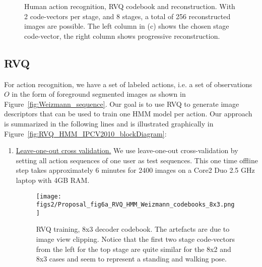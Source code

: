 \begin{Body}
								\begin{figure}[t]
								\centering
								\hspace{0.3in}
								\hspace{0.3in}
								\caption{Human action recognition, RVQ codebook and reconstruction.  With 2 code-vectors per stage, and 8 stages, a total of 256 reconstructed images are possible.  The left column in (c) shows the chosen stage code-vector, the right column shows progressive reconstruction.} 
							\label{fig:Weizmann_codebooks_and_reconstruction}		
								\end{figure}

\subsection{RVQ}
For action recognition, we have a set of labeled actions, i.e. a set of observations $O$ in the form of foreground segmented images as shown in Figure~\ref{fig:Weizmann_sequence}.  Our goal is to use RVQ to generate image descriptors that can be used to train one HMM model per action.  Our approach is summarized in the following lines and is illustrated graphically in Figure~\ref{fig:RVQ_HMM_IPCV2010_blockDiagram}:

\begin{enumerate}
\item \underline{Leave-one-out cross validation.}  We use leave-one-out cross-validation \cite{2000_JNL_SURVEYprml_Jain} by setting all action sequences of one user as test sequences.  This one time offline step takes approximately 6 minutes for 2400 images on a Core2 Duo 2.5 GHz laptop with 4GB RAM.

								\begin{figure}[t]	
								\centering
								\texttt{[image: figs2/Proposal\_fig6a\_RVQ\_HMM\_Weizmann\_codebooks\_8x3.png]}
								\caption{RVQ training, 8x3 decoder codebook.  The artefacts are due to image view clipping.  Notice that the first two stage code-vectors from the left for the top stage are quite similar for the 8x2 and 8x3 cases and seem to represent a standing and walking pose.}
							\label{fig:8x3_codebook}
								\end{figure}


\end{enumerate}
\end{Body}
